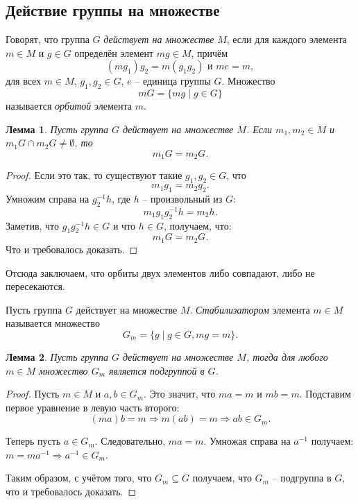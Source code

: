 \documentclass{article}
\newtheorem{lemma}{Лемма}[section]
\begin{document}
\subsection*{Действие группы на множестве}

Говорят, что группа $G$ \textit{действует на множестве} $M$, если для каждого элемента $m \in M$ и $g \in G$ определён элемент $mg \in M$, причём $$ (m g_1) g_2 = m(g_1 g_2) \text{ и } me = m, $$ для всех $m \in M$, $g_1, g_2 \in G$, $e$ -- единица группы $G$. Множество $$ mG = \{ mg \mid g \in G \} $$ называется \textit{орбитой} элемента $m$.

\begin{lemma}
    Пусть группа $G$ действует на множестве $M$. Если $m_1, m_2 \in M$ и $m_1 G \cap m_2 G  \neq \emptyset$, то $$ m_1 G = m_2 G. $$
\end{lemma}

\begin{proof}
    Если это так, то существуют такие $g_1, g_2 \in G$, что $$ m_1 g_1 = m_2 g_2. $$
    Умножим справа на $g_2^{-1} h$, где $h$ -- произвольный из $G$: $$ m_1 g_1 g_2^{-1} h = m_2 h. $$ Заметив, что $g_1 g_2^{-1} h \in G$ и что $h \in G$, получаем, что: $$ m_1 G = m_2 G. $$ Что и требовалось доказать.
\end{proof}

Отсюда заключаем, что орбиты двух элементов либо совпадают, либо не пересекаются.

Пусть группа $G$ действует на множестве $M$. \textit{Стабилизатором} элемента $m \in M$ называется множество $$ G_m = \{ g \mid g \in G, mg = m \}. $$

\begin{lemma}
    Пусть группа $G$ действует на множестве $M$, тогда для любого $m \in M$ множество $G_m$ является подгруппой в $G$.
\end{lemma}
\begin{proof}
    Пусть $m \in M$ и $a, b \in G_m$. Это значит, что $ma = m$ и $mb = m$. Подставим первое уравнение в левую часть второго: $$ (ma)b = m \Rightarrow m(ab) = m \Rightarrow ab \in G_m. $$

    Теперь пусть $a \in G_m$. Следовательно, $ma = m$. Умножая справа на $a^{-1}$ получаем: $m = m a^{-1} \Rightarrow a^{-1} \in G_m.$
    
    Таким образом, с учётом того, что $G_m \subseteq G$ получаем, что $G_m$ -- подгруппа в $G$, что и требовалось доказать. 
\end{proof}
\end{document}
